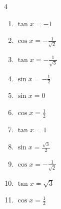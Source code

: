 \begin{multicols}{4}
\begin{enumerate}
  \item $\displaystyle \tan{x}  = -1$


  \item $\displaystyle \cos{x}  = -\frac{1}{\sqrt{2}}$


  \item $\displaystyle \tan{x}  = -\frac{1}{\sqrt{3}}$


  \item $\displaystyle \sin{x}  = -\frac{1}{2}$


  \item $\displaystyle \sin{x}  = 0$

        \phantom{$\displaystyle x = 0 , \pi$}

  \item $\displaystyle \cos{x}  = \frac{1}{2}$


  \item $\displaystyle \tan{x}  = 1$


  \item $\displaystyle \sin{x}  = \frac{\sqrt{3}}{2}$


  \item $\displaystyle \cos{x}  = -\frac{1}{\sqrt{2}}$


\columnbreak %

\resetques

  \item $\displaystyle \tan{x}  = \sqrt{3}$


  \item $\displaystyle \cos{x}  = \frac{1}{2}$


\end{enumerate}
\end{multicols}
